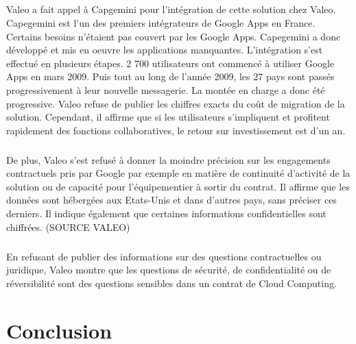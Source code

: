 \documentclass[a4paper,12pt]{report}
\begin{document}
\begin{onehalfspace}
	\paragraph*{}
	Valeo a fait appel à Capgemini pour l’intégration de cette solution chez Valeo. Capegemini est l’un des premiers intégrateurs de Google Apps en France. Certains besoins n’étaient pas couvert par les Google Apps. Capegemini a donc développé et mis en oeuvre les applications manquantes. L’intégration s’est effectué en plusieurs étapes. 2 700 utilisateurs ont commencé à utiliser Google Apps en mars 2009. Puis tout au long de l’année 2009, les 27 pays sont passés progressivement à leur nouvelle messagerie. La montée en charge a donc été progressive. Valeo refuse de publier les chiffres exacts du coût de migration de la solution. Cependant, il affirme que si les utilisateurs s’impliquent et profitent rapidement des fonctions collaboratives, le retour sur investissement est d'un an.
	\paragraph*{}
	De plus, Valeo s'est refusé à donner la moindre précision sur les engagements contractuels pris par Google par exemple en matière de continuité d'activité de la solution ou de capacité pour l'équipementier à sortir du contrat. Il affirme que les données sont hébergées aux Etats-Unis et dans d’autres pays, sans préciser ces derniers. Il indique également que certaines informations confidentielles sont chiffrées. (SOURCE VALEO)
	\paragraph*{}
	En refusant de publier des informations sur des questions contractuelles ou juridique, Valeo montre que les questions de sécurité, de confidentialité ou de réversibilité sont des questions sensibles dans un contrat de Cloud Computing.
	


	\chapter*{Conclusion}
	
	
	\tableofcontents


	\end{onehalfspace}
\end{document}
